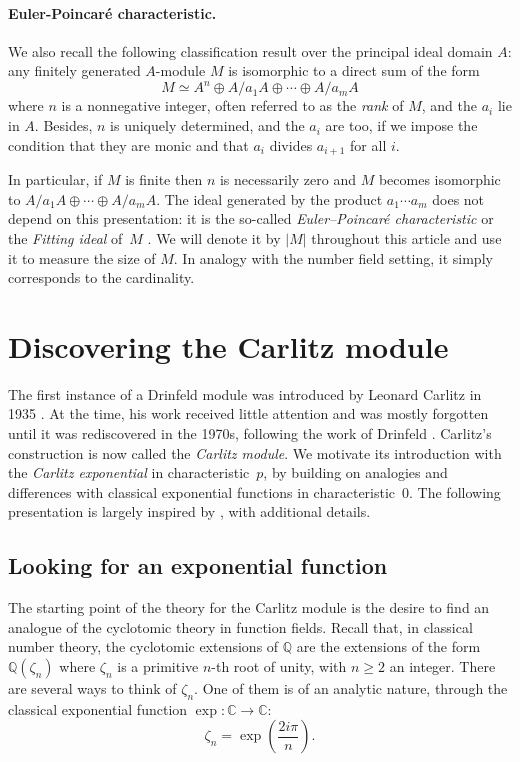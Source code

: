 \documentclass[11pt]{article}
\theoremstyle{definition}
\renewcommand\geq{\geqslant}
\newcommand\C{\mathbb{C}}
\newcommand\Q{\mathbb{Q}}
\begin{document}
\paragraph{Euler-Poincaré characteristic.}

We also recall the following classification result over the principal ideal domain $A$:
any finitely generated $A$-module $M$ is isomorphic to a direct sum
of the form
\[
  M \simeq A^n \oplus A/a_1A \oplus \cdots \oplus A/a_mA
\]
where $n$ is a nonnegative integer, often referred to as the \emph{rank}
of $M$, and the $a_i$ lie in $A$. Besides, $n$ is uniquely determined, and the $a_i$ are too, if we impose the condition that
they are monic and that $a_i$ divides $a_{i+1}$ for all $i$.

In particular, if $M$ is finite then $n$ is necessarily zero and $M$ 
becomes isomorphic to $A/a_1A \oplus \cdots \oplus A/a_mA$. The ideal 
generated by the product $a_1 \cdots a_m$ does not depend on this 
presentation: it is the so-called \emph{Euler--Poincaré characteristic} 
or the \emph{Fitting ideal} of~$M$ \cite[Chapter 3, 
\S~8]{lang_algebra_2002}.
We will denote it by $|M|$ throughout this article and use it to measure the size of $M$. In analogy with the number field setting, it simply corresponds to the cardinality.
	
\section{Discovering the Carlitz module}

\label{sec:carlitz}

The first instance of a Drinfeld module was introduced by Leonard Carlitz in 1935 \cite{C35}. At the time, his work received little attention and was mostly forgotten until it was rediscovered in the 1970s, following the work of Drinfeld \cite{drinfeld_commutative_1977}. Carlitz's construction is now called the \emph{Carlitz module}. We motivate its introduction with the \emph{Carlitz exponential} in characteristic~$p$, by building on analogies and differences with classical exponential functions in characteristic~$0$. The following presentation is largely inspired by \cite[\S~2.1]{Tha04}, with additional details.
 
\subsection{Looking for an exponential function}
\label{ssec:lookforexp}

The starting point of the theory for the Carlitz module is the desire to find an analogue of the cyclotomic theory in function fields. Recall that, in classical number theory, the cyclotomic extensions of $\Q$ are the extensions of the form $\Q(\zeta_n)$ where $\zeta_n$ is a primitive $n$-th root of unity, with $n\geq2$ an integer. There are several ways to think of $\zeta_n$. One of them is of an analytic nature, through the classical exponential function $\exp: \C\to\C$: 
$$\zeta_n = \exp\left(\frac{2i\pi}n\right).$$
\end{document}
